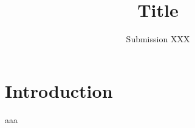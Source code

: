 \documentclass[10pt,letterpaper]{article}
\author{Submission XXX}
\title{Title}
\theoremstyle{definition}
\begin{document}
\maketitle
\begin{abstract}

\end{abstract}

\section{Introduction}




aaa \cite{Blum1997}

\fontsize{9.5pt}{10.5pt}
\selectfont


\end{document}

